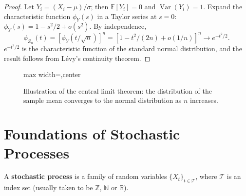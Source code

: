 \begin{proof}
Let $Y_i = (X_i - \mu)/\sigma$; then $\mathbb{E}[Y_i] = 0$ and $\operatorname{Var}(Y_i) = 1$. Expand the characteristic function $\phi_Y(s)$ in a Taylor series at $s = 0$: $\phi_Y(s) = 1 - s^2/2 + o(s^2)$. By independence,
\[
\phi_{Z_n}(t) = [\phi_Y(t/\sqrt{n})]^n = [1 - t^2/(2n) + o(1/n)]^n \to e^{-t^2/2}.
\]
$e^{-t^2/2}$ is the characteristic function of the standard normal distribution, and the result follows from Lévy's continuity theorem.
\end{proof}

\begin{figure}[htbp]
\centering
\begin{adjustbox}{max width=\linewidth,center}
\end{adjustbox}\par
\caption{Illustration of the central limit theorem: the distribution of the sample mean converges to the normal distribution as $n$ increases.}
\label{fig:clt}
\end{figure}

\section{Foundations of Stochastic Processes}\label{sec:stochastic_processes}

\begin{definition}\label{def:stochastic_process}
A \textbf{stochastic process} is a family of random variables $\{X_t\}_{t \in \mathcal{T}}$, where $\mathcal{T}$ is an index set (usually taken to be $\mathbb{Z}$, $\mathbb{N}$ or $\mathbb{R}$).
\end{definition}


